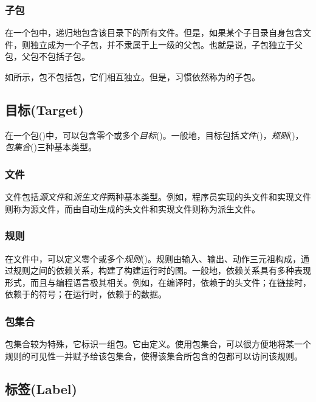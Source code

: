 \begin{content}
\subsubsection{子包}

在一个包中，递归地包含该目录下的所有文件。但是，如果某个子目录自身包含文件，则独立成为一个子包，并不隶属于上一级的父包。也就是说，子包独立于父包，父包不包括子包。

如所示，包不包括包，它们相互独立。但是，习惯依然称为的子包。

\subsection{目标(Target)}

在一个包()中，可以包含零个或多个\emph{目标}()。一般地，目标包括\emph{文件}()，\emph{规则}()，\emph{包集合}()三种基本类型。

\subsubsection{文件}

文件包括\emph{源文件}和\emph{派生文件}两种基本类型。例如，程序员实现的\cpp{}头文件和实现文件则称为源文件，而由自动生成的\cpp{}头文件和实现文件则称为派生文件。

\subsubsection{规则}

在文件中，可以定义零个或多个\emph{规则}()。规则由输入、输出、动作三元祖构成，通过规则之间的依赖关系，构建了构建运行时的图。一般地，依赖关系具有多种表现形式，而且与编程语言极其相关。例如，在编译时，依赖于的头文件；在链接时，依赖于的符号；在运行时，依赖于的数据。

\subsubsection{包集合}

包集合较为特殊，它标识一组包。它由定义。使用包集合，可以很方便地将某一个规则的可见性一并赋予给该包集合，使得该集合所包含的包都可以访问该规则。

\subsection{标签(Label)}


\end{content}
